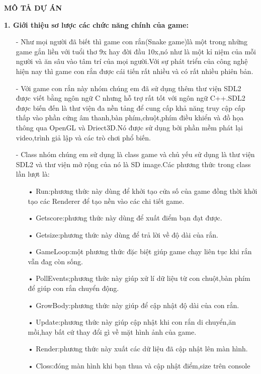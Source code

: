 \documentclass{article}
\begin{document}
\begin{center}
    \textbf{\Large MÔ TẢ DỰ ÁN}
\end{center}
\textbf{1. Giới thiệu sơ lược các chức năng chính của game:}
\begin{itemize}
    \item[-]Như mọi người đã biết thì game con rắn(Snake game)là một trong những game gắn liền với tuổi thơ 9x hay đời đầu 10x,nó như là một kỉ niệm của mỗi người và ăn sâu vào tâm trí của mọi người.Với sự phát triển của công nghệ hiện nay thì game con rắn được cái tiến rất nhiều và có rất nhiều phiên bản.
    \item[-]Với game con rắn này nhóm chúng em đã sử dụng thêm thư viện SDL2 được viết bằng ngôn ngữ C nhưng hỗ trợ rất tốt với ngôn ngữ C++.SDL2 được biến đến là thư viện đa nền tảng để cung cấp khả năng truy cập cấp thấp vào phần cứng âm thanh,bàn phím,chuột,phím điều khiển và đồ họa thông qua OpenGL và Driect3D.Nó được sử dụng bởi phần mềm phát lại video,trình giả lập và các trò chơi phổ biến.
    \item[-]Class nhóm chúng em sử dụng là class game và chủ yếu sử dụng là thư viện SDL2 và thư viện mở rộng của nó là SD image.Các phương thức trong class lần lượt là:
    \begin{itemize}
        \item[•]Run:phương thức này dùng để khởi tạo cửa số của game đồng thời khởi tạo các Renderer để tạo nền vào các chi tiết game.
        \item[•]Getscore:phương thức này dùng để xuất điểm bạn đạt được.
        \item[•]Getsize:phương thức này dùng để trả lời về độ dài của rắn.
        \item[•]GameLoop:một phương thức đặc biệt giúp game chạy liên tục khi rắn vẫn đag còn sống.
        \item[•]PollEvents;phương thức này giúp xử lí dữ liệu từ con chuột,bàn phím để giúp con rắn chuyển động.
        \item[•]GrowBody:phương thức này giúp để cập nhật độ dài của con rắn.
        \item[•]Update:phương thức này giúp cập nhật khi con rắn di chuyển,ăn mồi,hay bất cứ thay đổi gì về mặt hình ảnh của game.
        \item[•]Render:phương thức này xuất các dữ liệu đã cập nhật lên màn hình.
        \item[•]Closs:đóng màn hình khi bạn thua và cập nhật điểm,size trên console
    \end{itemize}
\end{itemize}
\end{document}
